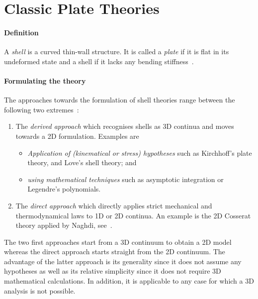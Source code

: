 %
%
%
%

\red

\section{Classic Plate Theories}
    \paragraph{Definition} A \textit{shell} is a curved thin-wall structure. It is called a \textit{plate} if it is flat in its undeformed state and a shell if it lacks any bending stiffness~\autocite{Libai.1983,Libai.2005}. 
    
    \paragraph{Formulating the theory}The approaches towards the formulation of shell theories range between the following two extremes~\autocite{Libai.1983,Altenbach.2005}:
    \begin{enumerate}[label=\Roman*.]
        \item The \textit{derived approach} which recognises shells as 3D continua and moves towards a 2D formulation. Examples are
        \begin{itemize}
            \item \textit{Application of (kinematical or stress) hypotheses} such as Kirchhoff's plate theory, and Love's shell theory; and
            \item \textit{using mathematical techniques} such as asymptotic integration or Legendre's polynomials.
        \end{itemize}
        \item The \textit{direct approach} which directly applies strict mechanical and thermodynamical laws to 1D or 2D continua. An example is the 2D Cosserat theory applied by Naghdi, see~\autocite{Truesdell.1973}.
    \end{enumerate}
    The two first approaches start from a 3D continuum to obtain a 2D model whereas the direct approach starts straight from the 2D continuum. The advantage of the latter approach is its generality since it does not assume any hypotheses as well as its relative simplicity since it does not require 3D mathematical calculations. In addition, it is applicable to any case for which a 3D analysis is not possible. 

